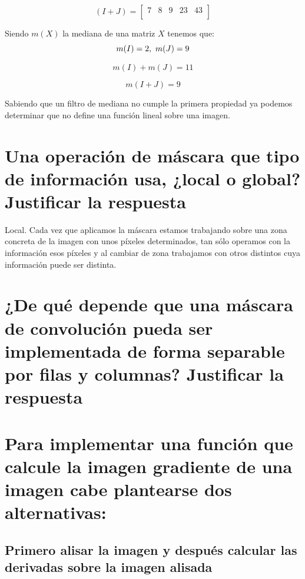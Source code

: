 \documentclass{article}
\begin{document}
\begin{equation}
(I+J) = \begin{bmatrix}
7 & 8 & 9 & 23 & 43 \\ 
\end{bmatrix}
\end{equation}

Siendo $m(X)$ la mediana de una matriz $X$ tenemos que:
\begin{equation}
m(I) = 2 ,\\\ m(J) = 9
\end{equation}

\begin{equation}
m(I)+m(J) = 11
\end{equation}

\begin{equation}
m(I + J) = 9
\end{equation}

Sabiendo que un filtro de mediana no cumple la primera propiedad ya podemos determinar que no define una función lineal sobre una imagen.

\section{Una operación de máscara que tipo de información usa, ¿local o global? Justificar la respuesta}
Local. Cada vez que aplicamos la máscara estamos trabajando sobre una zona concreta de la imagen con unos píxeles determinados, tan sólo operamos con la información esos píxeles y al cambiar de zona trabajamos con otros distintos cuya información puede ser distinta.

\section{¿De qué depende que una máscara de convolución pueda ser implementada de forma separable por filas y columnas? Justificar la respuesta}


\section{Para implementar una función que calcule la imagen gradiente de una imagen cabe plantearse dos alternativas:}

\subsection{Primero alisar la imagen y después calcular las derivadas sobre la imagen alisada }
\end{document}
